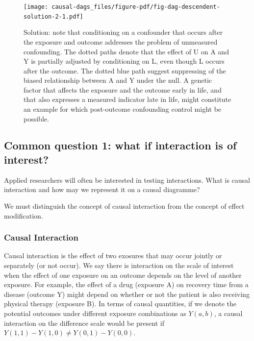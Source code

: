 \documentclass[
  singlecolumn]{report}
\begin{document}
\begin{figure}

{\centering \texttt{[image: causal-dags\_files/figure-pdf/fig-dag-descendent-solution-2-1.pdf]}

}

\caption{\label{fig-dag-descendent-solution-2}Solution: note that
conditioning on a confounder that occurs after the exposure and outcome
addresses the problem of unmeasured confounding. The dotted paths denote
that the effect of U on A and Y is partially adjusted by conditioning on
L, even though L occurs after the outcome. The dotted blue path suggest
suppressing of the biased relationship between A and Y under the null. A
genetic factor that affects the exposure and the outcome early in life,
and that also expresses a measured indicator late in life, might
constitute an example for which post-outcome confounding control might
be possible.}

\end{figure}

\hypertarget{common-question-1-what-if-interaction-is-of-interest}{%
\subsection{Common question 1: what if interaction is of
interest?}\label{common-question-1-what-if-interaction-is-of-interest}}

Applied researchers will often be interested in testing interactions.
What is causal interaction and how may we represent it on a causal
diagramme?

We must distinguish the concept of causal interaction from the concept
of effect modification.

\hypertarget{causal-interaction}{%
\subsubsection{\texorpdfstring{\textbf{Causal
Interaction}}{Causal Interaction}}\label{causal-interaction}}

Causal interaction is the effect of two exosures that may occur jointly
or separately (or not occur). We say there is interaction on the scale
of interest when the effect of one exposure on an outcome depends on the
level of another exposure. For example, the effect of a drug (exposure
A) on recovery time from a disease (outcome Y) might depend on whether
or not the patient is also receiving physical therapy (exposure B). In
terms of causal quantities, if we denote the potential outcomes under
different exposure combinations as \(Y(a,b)\), a causal interaction on
the difference scale would be present if
\(Y(1,1) - Y(1,0) \neq Y(0,1) - Y(0,0)\).
\end{document}
